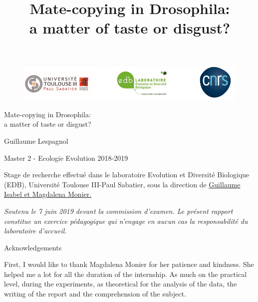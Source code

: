 \documentclass[a4paper, 12pt]{article}
\begin{document}
\title{Mate-copying in Drosophila:\\ a matter of taste or disgust?}		
\begin{figure}
	\vspace{-1cm}
	\hspace{-2cm}
	\includegraphics[width=20cm]{images/triche}
	
\end{figure}

\vspace*{3cm}


\begin{center}\huge Mate-copying in Drosophila:\\a matter of taste or disgust?\end{center}


\vspace*{1cm}

\begin{center}Guillaume Lespagnol\end{center}


\begin{center}Master 2 - Ecologie Evolution 2018-2019\end{center}

\vspace*{2cm}

Stage de recherche effectué dans le laboratoire Evolution et Diversité Biologique (EDB), Université Toulouse III-Paul Sabatier, sous la direction de \underline{Guillaume Isabel et Magdalena Monier.}
\vspace*{2cm}

\textit{Soutenu le 7 juin 2019 devant la
commission d'examen. Le présent rapport constitue un exercice 
pédagogique qui n'engage en aucun cas la responsabilité du laboratoire 
d'accueil.}





   
     \setcounter{page}{1} %
	
	
	\clearpage
	
	
 \begin{LARGE}
 	Acknowledgements
 \end{LARGE}
 
 \bigskip
	First, I would like to thank Magdalena Monier for her patience and kindness. She helped me a lot for all the duration of the internship. As much on the practical level, during the experiments, as theoretical for the analysis of the data, the writing of the report and the comprehension of the subject.
	
\end{document}
